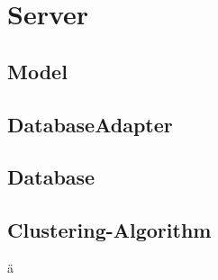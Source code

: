 
\section{Server}
	\subsection{Model}
	\subsection{DatabaseAdapter}
	\subsection{Database}
	\subsection{Clustering-Algorithm}
	ä
	\newpage